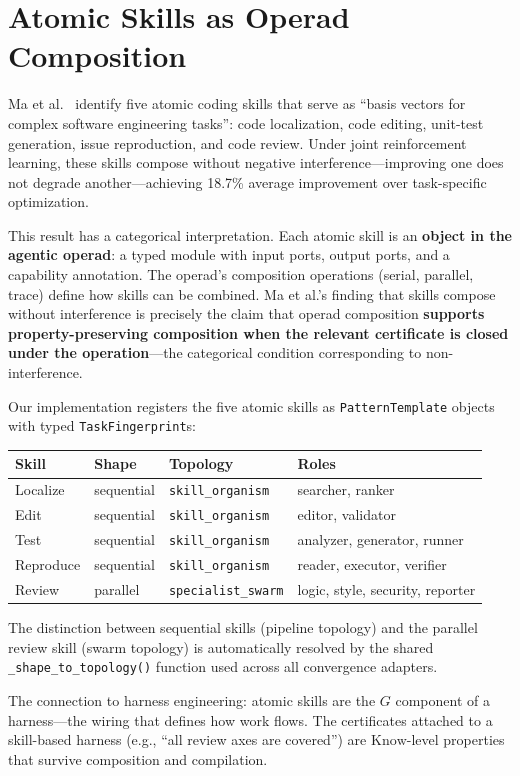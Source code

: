 \section{Atomic Skills as Operad Composition}\label{sec:atomic}

Ma et al.~\cite{ma2026atomic} identify five atomic coding skills that serve as ``basis vectors for complex software engineering tasks'': code localization, code editing, unit-test generation, issue reproduction, and code review. Under joint reinforcement learning, these skills compose without negative interference---improving one does not degrade another---achieving 18.7\% average improvement over task-specific optimization.

This result has a categorical interpretation. Each atomic skill is an \textbf{object in the agentic operad}: a typed module with input ports, output ports, and a capability annotation. The operad's composition operations (serial, parallel, trace) define how skills can be combined. Ma et al.'s finding that skills compose without interference is precisely the claim that operad composition \textbf{supports property-preserving composition when the relevant certificate is closed under the operation}---the categorical condition corresponding to non-interference.

Our implementation registers the five atomic skills as \texttt{PatternTemplate} objects with typed \texttt{TaskFingerprint}s:

\begin{center}
\small
\begin{tabular}{@{}llll@{}}
\toprule
\textbf{Skill} & \textbf{Shape} & \textbf{Topology} & \textbf{Roles} \\
\midrule
Localize & sequential & \texttt{skill\_organism} & searcher, ranker \\
Edit & sequential & \texttt{skill\_organism} & editor, validator \\
Test & sequential & \texttt{skill\_organism} & analyzer, generator, runner \\
Reproduce & sequential & \texttt{skill\_organism} & reader, executor, verifier \\
Review & parallel & \texttt{specialist\_swarm} & logic, style, security, reporter \\
\bottomrule
\end{tabular}
\end{center}

The distinction between sequential skills (pipeline topology) and the parallel review skill (swarm topology) is automatically resolved by the shared \texttt{\_shape\_to\_topology()} function used across all convergence adapters.

The connection to harness engineering: atomic skills are the $G$ component of a harness---the wiring that defines how work flows. The certificates attached to a skill-based harness (e.g., ``all review axes are covered'') are $\mathrm{Know}$-level properties that survive composition and compilation.
